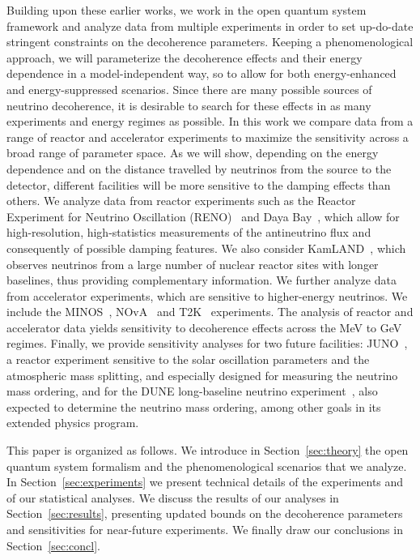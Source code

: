 \documentclass[aps, prd, onecolumn, tightenlines, notitlepage, superscriptaddress, nofootinbib, preprintnumbers, floatfix,showkeys,11pt]{revtex4-2}
\begin{document}
Building upon these earlier works, we work in the open quantum system framework and analyze data from multiple experiments in order to set up-do-date stringent constraints on the decoherence parameters. Keeping a phenomenological approach, we will parameterize the decoherence effects and their energy dependence in a model-independent way, so to allow for both energy-enhanced and energy-suppressed scenarios. Since there are many possible sources of neutrino decoherence, it is desirable to search for these effects in as many experiments and energy regimes as possible. In this work we compare data from a range of reactor and accelerator experiments to maximize the sensitivity across a broad range of parameter space. As we will show, depending on the energy dependence and on the distance travelled by neutrinos from the source to the detector, different facilities will be more sensitive to the damping effects than others. We analyze data from reactor experiments such as the Reactor Experiment for Neutrino Oscillation (RENO)~\cite{jonghee_yoo_2020_4123573} and Daya Bay~\cite{DayaBay:2018yms}, which allow for high-resolution, high-statistics measurements of the antineutrino flux and consequently of possible damping features. We also consider KamLAND~\cite{Gando:2010aa,kamland_web}, which observes neutrinos from a large number
of nuclear reactor sites with longer baselines, thus providing complementary information. We further analyze data from accelerator experiments, which are sensitive to higher-energy neutrinos. We include the MINOS~\cite{Adamson:2017uda}, NOvA~\cite{NOvA:2018gge,NOvA:2021nfi} and T2K~\cite{Abe:2021gky} experiments. The analysis of reactor and accelerator data yields sensitivity to decoherence effects across the MeV to GeV regimes. Finally, we provide sensitivity analyses for two future facilities:  JUNO~\cite{JUNO:2015zny,JUNO:2021vlw}, a reactor experiment sensitive to the solar oscillation parameters and the atmospheric mass splitting, and especially designed for measuring the neutrino mass ordering, and for the DUNE long-baseline neutrino experiment~\cite{DUNE:2020lwj,DUNE:2020ypp,DUNE:2020mra,DUNE:2020txw}, also expected to determine the neutrino mass ordering, among other goals in its extended physics program.

This paper is organized as follows. We introduce in Section~\ref{sec:theory} the open quantum system formalism and the phenomenological scenarios that we analyze. In Section~\ref{sec:experiments} we present technical details of the experiments and of our statistical analyses. We discuss the results of our analyses in Section~\ref{sec:results}, presenting updated bounds on the decoherence parameters and sensitivities for near-future experiments. We finally draw our conclusions in Section~\ref{sec:concl}.
\end{document}
